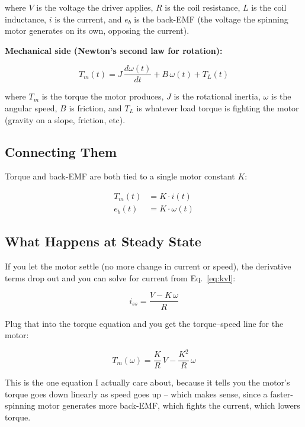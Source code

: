 \documentclass[12pt,a4paper]{article}
\begin{document}
where $V$ is the voltage the driver applies, $R$ is the coil resistance, $L$ is the coil
inductance, $i$ is the current, and $e_b$ is the back-EMF (the voltage the spinning motor
generates on its own, opposing the current).

\textbf{Mechanical side (Newton's second law for rotation):}

\begin{equation}
    T_m(t) = J\,\frac{d\omega(t)}{dt} + B\,\omega(t) + T_L(t)
    \label{eq:newton}
\end{equation}

where $T_m$ is the torque the motor produces, $J$ is the rotational inertia, $\omega$ is
the angular speed, $B$ is friction, and $T_L$ is whatever load torque is fighting the motor
(gravity on a slope, friction, etc).

\subsection{Connecting Them}

Torque and back-EMF are both tied to a single motor constant $K$:

\begin{align}
    T_m(t) &= K \cdot i(t) \\
    e_b(t) &= K \cdot \omega(t)
\end{align}

\subsection{What Happens at Steady State}

If you let the motor settle (no more change in current or speed), the derivative terms
drop out and you can solve for current from Eq.~\eqref{eq:kvl}:

\begin{equation}
    i_{ss} = \frac{V - K\,\omega}{R}
\end{equation}

Plug that into the torque equation and you get the torque--speed line for the motor:

\begin{equation}
    T_m(\omega) = \frac{K}{R}\,V - \frac{K^2}{R}\,\omega
    \label{eq:tm_omega}
\end{equation}

This is the one equation I actually care about, because it tells you the motor's torque
goes down linearly as speed goes up -- which makes sense, since a faster-spinning motor
generates more back-EMF, which fights the current, which lowers torque.
\end{document}

